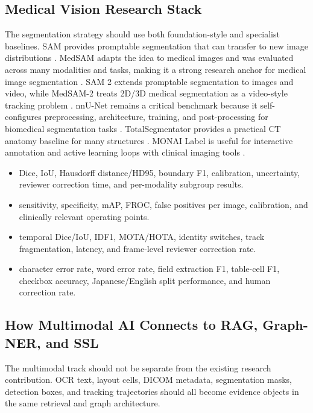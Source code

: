 \subsection{Medical Vision Research Stack}

The segmentation strategy should use both foundation-style and specialist baselines. SAM provides promptable segmentation that can transfer to new image distributions \cite{sam2023}. MedSAM adapts the idea to medical images and was evaluated across many modalities and tasks, making it a strong research anchor for medical image segmentation \cite{medsam2024}. SAM 2 extends promptable segmentation to images and video, while MedSAM-2 treats 2D/3D medical segmentation as a video-style tracking problem \cite{sam2,medsam2}. nnU-Net remains a critical benchmark because it self-configures preprocessing, architecture, training, and post-processing for biomedical segmentation tasks \cite{nnunet}. TotalSegmentator provides a practical CT anatomy baseline for many structures \cite{totalSegmentator}. MONAI Label is useful for interactive annotation and active learning loops with clinical imaging tools \cite{monaiLabel}.

\begin{itemize}
  \item {} Dice, IoU, Hausdorff distance/HD95, boundary F1, calibration, uncertainty, reviewer correction time, and per-modality subgroup results.
  \item {} sensitivity, specificity, mAP, FROC, false positives per image, calibration, and clinically relevant operating points.
  \item {} temporal Dice/IoU, IDF1, MOTA/HOTA, identity switches, track fragmentation, latency, and frame-level reviewer correction rate.
  \item {} character error rate, word error rate, field extraction F1, table-cell F1, checkbox accuracy, Japanese/English split performance, and human correction rate.
\end{itemize}

\subsection{How Multimodal AI Connects to RAG, Graph-NER, and SSL}

The multimodal track should not be separate from the existing research contribution. OCR text, layout cells, DICOM metadata, segmentation masks, detection boxes, and tracking trajectories should all become evidence objects in the same retrieval and graph architecture.

